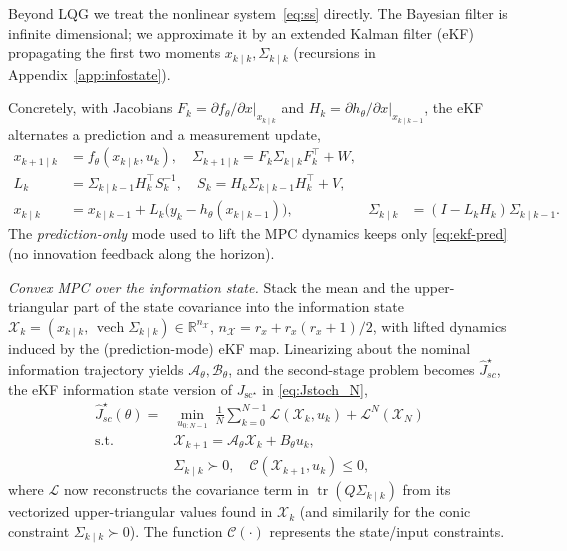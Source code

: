 \documentclass[twocolumn,amsthm]{autart}
\begin{document}
Beyond LQG we treat the nonlinear system~\eqref{eq:ss} directly. The
Bayesian filter is infinite dimensional; we approximate it by an extended Kalman
filter (eKF) \cite{anderson2012optimal,ramadan2024extended} propagating the first
two moments $x_{k\mid k},\Sigma_{k\mid k}$ (recursions in
Appendix~\ref{app:infostate}).

Concretely, with Jacobians $F_k = \partial f_\theta/\partial x|_{x_{k\mid k}}$ and
$H_k = \partial h_\theta/\partial x|_{x_{k\mid k-1}}$, the eKF alternates a
prediction and a measurement update,
\begin{subequations}\label{eq:ekf}
\begin{align}
x_{k+1\mid k} &= f_\theta(x_{k\mid k},u_k), \quad
\Sigma_{k+1\mid k} = F_k \Sigma_{k\mid k} F_k^\top + W, \label{eq:ekf-pred}\\
L_k &= \Sigma_{k\mid k-1} H_k^\top S_k^{-1}, \quad
S_k = H_k \Sigma_{k\mid k-1} H_k^\top + V,\\
x_{k\mid k} &= x_{k\mid k-1} + L_k\big(y_k - h_\theta(x_{k\mid k-1})\big), &
\Sigma_{k\mid k} &= (I - L_k H_k)\Sigma_{k\mid k-1}.
\end{align}
\end{subequations}
The \emph{prediction-only} mode used to lift the MPC dynamics keeps only
\eqref{eq:ekf-pred} (no innovation feedback along the horizon).

\emph{Convex MPC over the information state.} Stack the mean and the
upper-triangular part of the state covariance into the information state
$\mathcal X_k = (x_{k\mid k},\, \operatorname{vech}\Sigma_{k\mid k}) \in
\mathbb{R}^{n_\mathcal X}$, $n_\mathcal X = r_x + r_x(r_x+1)/2$, with lifted dynamics
induced by the (prediction-mode) eKF map. Linearizing about the nominal
information trajectory yields $\mathcal A_\theta, \mathcal B_\theta$,
and the second-stage problem becomes $\widehat J_{sc} ^\star$, the eKF information state version of $J_{\mathrm{sc}^\star}$ in \eqref{eq:Jstoch_N},
\begin{equation}\label{eq:mpc}
\begin{aligned}
\widehat J^\star_{sc}(\theta) = &\min_{u_{0:N-1}}\
\frac{1}{N}\sum_{k=0}^{N-1} \mathcal L(\mathcal X_k,u_k) + \mathcal L^N(\mathcal X_N)\\
\text{s.t. } & \mathcal X_{k+1} = \mathcal A_\theta \mathcal X_k +
B_\theta u_k,\\
& \Sigma_{k\mid k} \succ 0,\quad \mathcal C(\mathcal X_{k+1},u_k) \le 0,
\end{aligned}
\end{equation}
where $\mathcal L$ now reconstructs the covariance term in $\operatorname{tr}(Q\Sigma_{k\mid k})$ from its vectorized upper-triangular values found in $\mathcal X_k$ (and similarily for the conic constraint $\Sigma_{k\mid k} \succ 0$). 
The function $\mathcal C(\cdot)$ represents the state/input constraints.
\end{document}
